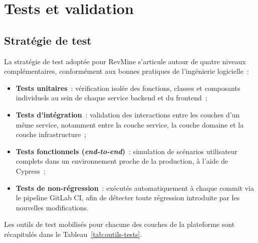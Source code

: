 \section{Tests et validation}

\subsection{Stratégie de test}

La stratégie de test adoptée pour RevMine s'articule autour de quatre niveaux complémentaires,
conformément aux bonnes pratiques de l'ingénierie logicielle~:

\begin{itemize}
    \item \textbf{Tests unitaires}~: vérification isolée des fonctions, classes et composants
          individuels au sein de chaque service backend et du frontend~;
    \item \textbf{Tests d'intégration}~: validation des interactions entre les couches d'un même
          service, notamment entre la couche service, la couche domaine et la couche
          infrastructure~;
    \item \textbf{Tests fonctionnels (\textit{end-to-end})}~: simulation de scénarios utilisateur
          complets dans un environnement proche de la production, à l'aide de Cypress~;
    \item \textbf{Tests de non-régression}~: exécutés automatiquement à chaque commit via le
          pipeline GitLab CI, afin de détecter toute régression introduite par les nouvelles
          modifications.
\end{itemize}

Les outils de test mobilisés pour chacune des couches de la plateforme sont récapitulés dans le
Tableau~\ref{tab:outils-tests}.

